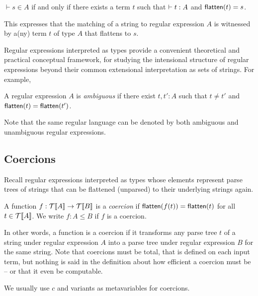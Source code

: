 \begin{proposition} 
$\vdash s \in A$ if and only if there exists a term $t$ such that $\vdash t : A$ and $\mathsf{flatten}(t) = s$.
\end{proposition}
This expresses that the matching of a string to regular expression $A$ is witnessed by a(ny) term $t$ of type $A$ that flattens to $s$.

Regular expressions interpreted as types provide a convenient theoretical and practical conceptual framework, for studying the intensional structure of regular expressions beyond their common extensional interpretation as sets of strings.  For example,

\begin{definition}[Ambiguity] 
A regular expression $A$ is \emph{ambiguous} if there exist $t, t': A$ such that $t \neq t'$ and $\mathsf{flatten}(t) = \mathsf{flatten}(t')$.  
\end{definition}
Note that the same regular language can be denoted by both ambiguous and unambiguous regular expressions.

\subsection{Coercions}

Recall regular expressions interpreted as types whose elements represent parse trees of strings that can be flattened (unparsed) to their underlying strings again.  

\begin{definition}[Coercion]
A function $f :\mathcal{T}\llbracket A \rrbracket \rightarrow \mathcal{T}\llbracket B \rrbracket$ is a \emph{coercion} if $\mathsf{flatten}(f(t)) = \mathsf{flatten}(t)$ for all $t \in \mathcal{T}\llbracket A \rrbracket$.
We write $f : A \leq B$ if $f$ is a coercion.
\end{definition}
In other words, a function is a coercion if it transforms any parse tree $t$ of a string under regular expression $A$ into a parse tree under regular expression $B$ for the same string.  Note that coercions must be total, that is defined on each input term, but nothing is said in the definition about how efficient a coercion must be -- or that it even be computable.  

We usually use $c$ and variants as metavariables for coercions.

